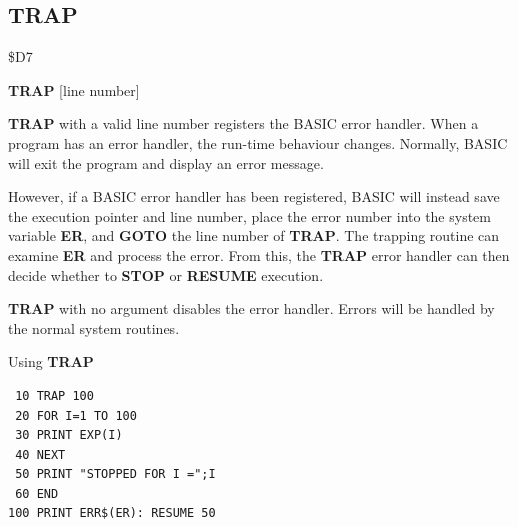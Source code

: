 \subsection{TRAP}
\begin{description}[leftmargin=2cm,style=nextline]
\item [Token:] \$D7
\item [Format:] {\bf TRAP} [line number]
\item [Usage:]  {\bf TRAP} with a valid line number registers the
                BASIC error handler. When a program has an error handler, the
                run-time behaviour changes. Normally, BASIC will exit the program
                and display an error message.

                However, if a BASIC error handler has been registered, BASIC will
                instead save the execution pointer and line number, place the
                error number into the system variable {\bf ER}, and {\bf GOTO}
                the line number of {\bf TRAP}. The trapping routine can examine
                {\bf ER} and process the error. From this, the {\bf TRAP} error
                handler can then decide whether to {\bf STOP} or {\bf RESUME} execution.

                {\bf TRAP} with no argument disables the error handler.
                Errors will be handled by the normal system routines.

\item [Example:] Using {\bf TRAP}
\begin{tcolorbox}[colback=black,coltext=white]
\verbatimfont{\codefont}
\begin{verbatim}
 10 TRAP 100
 20 FOR I=1 TO 100
 30 PRINT EXP(I)
 40 NEXT
 50 PRINT "STOPPED FOR I =";I
 60 END
100 PRINT ERR$(ER): RESUME 50
\end{verbatim}
\end{tcolorbox}
\end{description}


\newpage
